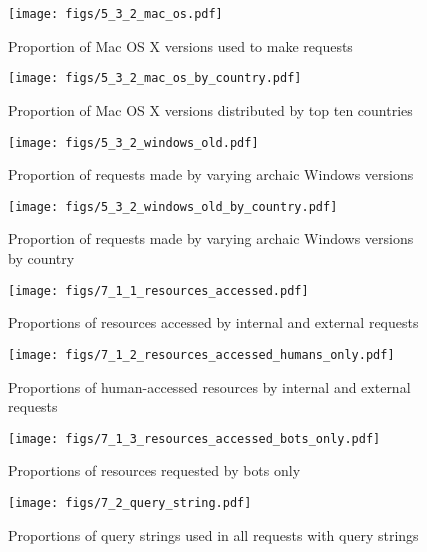 \documentclass[12pt,titlepage]{article}
\begin{document}
\begin{figure}[thbp]
  \centering
  \texttt{[image: figs/5\_3\_2\_mac\_os.pdf]}
  \caption{Proportion of Mac OS X versions used to make requests}
  \label{fig:5_3_2_mac_os}
\end{figure}

\begin{figure}[thbp]
  \centering
  \texttt{[image: figs/5\_3\_2\_mac\_os\_by\_country.pdf]}
  \caption{Proportion of Mac OS X versions distributed by top ten countries}
  \label{fig:5_3_2_mac_os_by_country}
\end{figure}

\begin{figure}[thbp]
  \centering
  \texttt{[image: figs/5\_3\_2\_windows\_old.pdf]}
  \caption{Proportion of requests made by varying archaic Windows versions}
  \label{fig:5_3_2_windows_old}
\end{figure}

\begin{figure}[thbp]
  \centering
  \texttt{[image: figs/5\_3\_2\_windows\_old\_by\_country.pdf]}
  \caption{Proportion of requests made by varying archaic Windows versions by country}
  \label{fig:5_3_2_windows_old_by_country}
\end{figure}


\begin{figure}[thbp]
  \centering
  \texttt{[image: figs/7\_1\_1\_resources\_accessed.pdf]}
  \caption{Proportions of resources accessed by internal and external requests}
  \label{fig:7_1_1_resources_accessed}
\end{figure}

\begin{figure}[thbp]
  \centering
  \texttt{[image: figs/7\_1\_2\_resources\_accessed\_humans\_only.pdf]}
  \caption{Proportions of human-accessed resources by internal and external requests}
  \label{fig:7_1_2_resources_accessed_humans_only}
\end{figure}

\begin{figure}[thbp]
  \centering
  \texttt{[image: figs/7\_1\_3\_resources\_accessed\_bots\_only.pdf]}
  \caption{Proportions of resources requested by bots only}
  \label{fig:7_1_3_resources_accessed_bots_only}
\end{figure}

\begin{figure}[thbp]
  \centering
  \texttt{[image: figs/7\_2\_query\_string.pdf]}
  \caption{Proportions of query strings used in all requests with query strings}
  \label{fig:7_2_query_string}
\end{figure}
\end{document}
